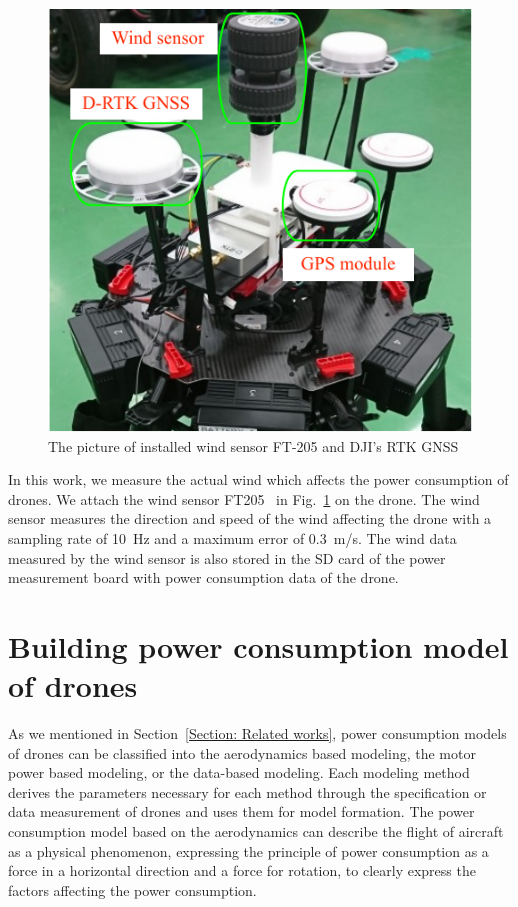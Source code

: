 \documentclass[journal]{./template/IEEEtran}
\begin{document}
\begin{figure}[ht]
\centering\includegraphics[scale=0.90]{fig5/wind_sensor.pdf}
\caption{The picture of installed wind sensor FT-205 and DJI's RTK GNSS}
\label{fig:wind_sensor}
\end{figure}

In this work, we measure the actual wind which affects the power consumption of drones. 
We attach the wind sensor FT205~\cite{ref_15} in Fig.~\ref{fig:wind_sensor} on the drone. 
The wind sensor measures the direction and speed of the wind affecting the drone with a sampling rate of 10~Hz and a maximum error of 0.3~m/s.
The wind data measured by the wind sensor is also stored in the SD card of the power measurement board with power consumption data of the drone.











\section{Building power consumption model of drones}
\label{Section: Power consumption model for drones}
As we mentioned in Section~\ref{Section: Related works}, power consumption models of drones can be classified into the aerodynamics based modeling, the motor power based modeling, or the data-based modeling. 
Each modeling method derives the parameters necessary for each method through the specification or data measurement of drones and uses them for model formation.
The power consumption model based on the aerodynamics can describe the flight of aircraft as a physical phenomenon, expressing the principle of power consumption as a force in a horizontal direction and a force for rotation, to clearly express the factors affecting the power consumption. 
\end{document}
